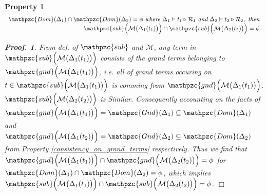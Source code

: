 \documentclass[12pt]{article}
\newtheorem{Property}{Property}[section]
\newtheorem{Proof}{Proof.}
\begin{document}
\begin{Property}
  \label{consistency_on_domain_independency}
  \[ \begin{array}{r}
       \mathpzc{Dom}(\Delta_1) \cap \mathpzc{Dom}(\Delta_2) = \phi\
        \text{\it where}\ \Delta_1 \vdash t_1 \triangleright \mathcal{R}_1\
         \text{\it and}\ \Delta_2 \vdash t_2 \triangleright \mathcal{R}_2,\
          \text{\it then}  \\
       \mathpzc{sub}\Bigl(\mathcal{M}\bigl(\Delta_1(t_1) \bigr) \Bigr) \cap
        \mathpzc{sub}\Bigl(\mathcal{M}\bigl(\Delta_2(t_2) \bigr) \Bigr) = \phi
     \end{array}
  \]
  \begin{Proof}
    From def. of $\mathpzc{sub}$ and $\mathcal{M}$, any term in
    $\mathpzc{sub}\Bigl(\mathcal{M}\bigl(\Delta_1(t_1) \bigr) \Bigr)$
    consists of the grand terms belonging to
    $\mathpzc{gnd}\Bigl(\mathcal{M}\bigl(\Delta_1(t_1) \bigr) \Bigr)$, i.e.
    all of grand terms occuring on
    $t \in \mathpzc{sub}\Bigl(\mathcal{M}\bigl(\Delta_1(t_1) \bigr) \Bigr)$
    is comming from
    $\mathpzc{gnd}\Bigl(\mathcal{M}\bigl(\Delta_1(t_1) \bigr) \Bigr)$.
    $\mathpzc{sub}\Bigl(\mathcal{M}\bigl(\Delta_2(t_2) \bigr) \Bigr)$ is
    Similar. Consequently accounting on the facts of
    $\mathpzc{gnd}\Bigl(\mathcal{M}\bigl(\Delta_1(t_1) \bigr) \Bigr) =
    \mathpzc{Gnd}(\Delta_1) \subseteq \mathpzc{Dom}(\Delta_1)$ and
    $\mathpzc{gnd}\Bigl(\mathcal{M}\bigl(\Delta_1(t_2) \bigr) \Bigr) =
    \mathpzc{Gnd}(\Delta_2) \subseteq \mathpzc{Dom}(\Delta_2)$ from
    Property \ref{consistency_on_grand_terms} respectively. Thus we find that
    $\mathpzc{gnd}\Bigl(\mathcal{M}\bigl(\Delta_1(t_1) \bigr) \Bigr) \cap
    \mathpzc{gnd}\Bigl(\mathcal{M}\bigl(\Delta_2(t_2) \bigr) \Bigr) = \phi$
    for $\mathpzc{Dom}(\Delta_1) \cap \mathpzc{Dom}(\Delta_2) = \phi$, which
    implies
    $\mathpzc{sub}\Bigl(\mathcal{M}\bigl(\Delta_1(t_1) \bigr) \Bigr) \cap
    \mathpzc{sub}\Bigl(\mathcal{M}\bigl(\Delta_2(t_2) \bigr) \Bigr) = \phi$.
    $\Box$
  \end{Proof}
\end{Property}
\end{document}
